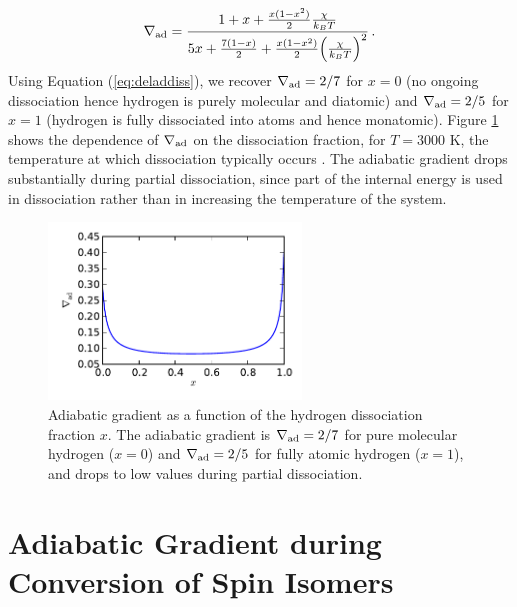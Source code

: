 

\begin{equation}
\label{eq:deladdiss}
\nabla_{\rm ad}=\frac{1+x+ \frac{x(1-x^2)}{2} \frac{\chi}{k_B T}}{5 x + \frac{7(1-x)}{2} + \frac{x(1-x^2)}{2} \Big(\frac{\chi}{k_B T}\Big)^2} \, .
\end{equation} 
Using Equation (\ref{eq:deladdiss}), we recover $\nabla_{\rm ad}=2/7$ for $x=0$ (no ongoing dissociation hence hydrogen is purely molecular and diatomic) and $\nabla_{\rm ad}=2/5$ for $x=1$ (hydrogen is fully dissociated into atoms and hence monatomic). Figure \ref{fig:deladdiss} shows the dependence of $\nabla_{\rm ad}$ on the dissociation fraction, for $T=3000$ K, the temperature at which dissociation typically occurs \citep{langmuir12}. The adiabatic gradient drops substantially during partial dissociation, since part of the internal energy is used in dissociation rather than in increasing the temperature of the system.


\begin{figure}[H]
\centering
\includegraphics[width=0.6\textwidth]{figures/delad_dissociation.pdf}
\caption{Adiabatic gradient as a function of the hydrogen dissociation fraction $x$. The adiabatic gradient is $\nabla_{\rm ad}=2/7$ for pure molecular hydrogen ($x=0$) and $\nabla_{\rm ad}=2/5$ for fully atomic hydrogen ($x=1$), and drops to low values during partial dissociation.}
\label{fig:deladdiss}
\end{figure}


\section{Adiabatic Gradient during Conversion of Spin Isomers}
\label{deladspin}

